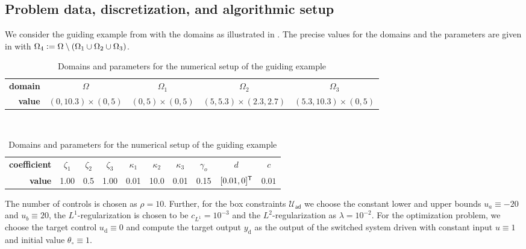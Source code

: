 \documentclass[reqno]{amsart}
\newcommand{\U}{{\mathscr U}}
\newcommand{\Uad}{\U_{\mathsf{ad}}}
\newcommand{\state}{\theta}
\newcommand{\desired}[1]{#1_{\mathrm{d}}}
\newcommand{\inpVar}{u}
\newcommand{\inpVarDes}{\desired{u}}
\newcommand{\inpVarDim}{\rho}
\newcommand{\outVarDes}{\desired{y}}
\newcommand{\lonereg}{c_{L^1}}
\newcommand{\cOper}{\calC}
\newcommand{\switch}{\sigma}
\newcommand{\advection}{d}
\newcommand{\calC}{\mathcal{C}}
\newcommand{\T}{\ensuremath\mathsf{T}}
\newcommand{\abbr}[1]{\textsf{#1}\xspace}
\newcommand{\PDE}{\abbr{PDE}}
\begin{document}
\subsection{Problem data, discretization, and algorithmic setup}
\label{subsec:computationalSetup}
We consider the guiding example from  with the domains as illustrated in . The precise values for the domains and the parameters are given in  with $\Omega_4 \vcentcolon= \Omega\setminus (\Omega_1\cup \Omega_2 \cup \Omega_3)$.
%
\begin{table}[ht!]
    \centering
    \caption{Domains and parameters for the numerical setup of the guiding example}
    \label{tab:parameters}
    \begin{tabular}{rcccc}
        \toprule
        \textbf{domain} & $\Omega$ & $\Omega_1$ & $\Omega_2$ & $\Omega_3$\\
        \textbf{value} & $(0,10.3)\times(0,5)$ & $(0,5)\times(0,5)$ & $(5,5.3)\times(2.3,2.7)$ & $(5.3,10.3)\times(0,5)$\\\bottomrule
    \end{tabular}\\[.5em]
    \begin{tabular}{rccccccccc}
        \toprule
        \textbf{coefficient} & $\zeta_1$ & $\zeta_2$ & $\zeta_3$ & $\kappa_1$ & $\kappa_2$ & $\kappa_3$ & $\gamma_o$ & $\advection$ & $c$ \\%
        \textbf{value} & 1.00 & 0.5 & 1.00 & 0.01 & 10.0 & 0.01 & 0.15 & $[0.01, 0]^\T$ &$0.01$\\\bottomrule
    \end{tabular}
\end{table}
%
The number of controls is chosen as $\inpVarDim = 10$. Further, for the box constraints $\Uad$ we choose the constant lower and upper bounds $u_a\equiv -20$ and $u_b \equiv 20$, the $L^1$-regularization is chosen to be $\lonereg= 10^{-3}$ and the  $L^2$-regularization as $\lambda= 10^{-2}$. 
%
For the optimization problem, we choose the target control $\inpVarDes\equiv 0$ and compute the target output $\outVarDes$ as the output of the switched system driven with constant input $\inpVar\equiv 1$ and initial value $\state_\circ\equiv 1$. 
\end{document}
